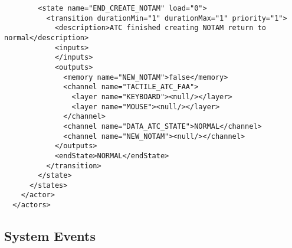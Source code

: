\begin{verbatim}
        <state name="END_CREATE_NOTAM" load="0">
          <transition durationMin="1" durationMax="1" priority="1">
            <description>ATC finished creating NOTAM return to normal</description>
            <inputs>
            </inputs>
            <outputs>
              <memory name="NEW_NOTAM">false</memory>
              <channel name="TACTILE_ATC_FAA">
                <layer name="KEYBOARD"><null/></layer>
                <layer name="MOUSE"><null/></layer>
              </channel>
              <channel name="DATA_ATC_STATE">NORMAL</channel>
              <channel name="NEW_NOTAM"><null/></channel>
            </outputs>
            <endState>NORMAL</endState>
          </transition>
        </state>
      </states>
    </actor>
  </actors>
\end{verbatim}
\subsection{System Events} 
